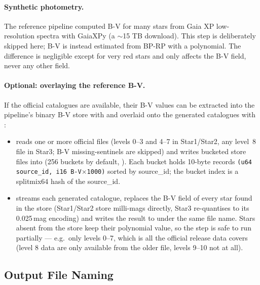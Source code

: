 \paragraph{Synthetic photometry.} The reference pipeline computed B-V for
many stars from Gaia XP low-resolution spectra with GaiaXPy (a $\sim$15 TB
download). This step is deliberately skipped here; B-V is instead estimated
from BP-RP with a polynomial. The difference is negligible except for very
red stars and only affects the B-V field, never any other field.

\paragraph{Optional: overlaying the reference B-V.} If the official
catalogues are available, their B-V values can be extracted into the
pipeline's binary B-V store with  and overlaid onto the
generated catalogues with :

\begin{itemize}
  \item {} reads one or more official
         files (levels 0--3 and 4--7 in Star1/Star2, any
        level~8 file in Star3; B-V missing-sentinels are skipped) and writes
        bucketed store files  into 
        (256 buckets by default, ). Each bucket holds
        10-byte records \texttt{(u64 source\_id, i16 B-V$\times$1000)}
        sorted by source\_id; the bucket index is a splitmix64 hash of the
        source\_id.
  \item {} streams each
        generated catalogue, replaces the B-V field of every star found in
        the store (Star1/Star2 store milli-mags directly, Star3 re-quantises
        to its 0.025\,mag encoding) and writes the result to
         under the same file name. Stars absent from
        the store keep their polynomial value, so the step is safe to run
        partially --- e.g.\ only levels 0--7, which is all the official
        release data covers (level 8 data are only available from the older
         file, levels 9--10 not at all).
\end{itemize}

\subsection{Output File Naming}
\label{sec:StarCatalogues:Generating:Naming}

